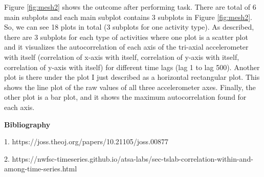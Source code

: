 \documentclass{article}
\begin{document}
Figure \ref{fig:mesh2} shows the outcome after performing task. There are total of 6 main subplots and each main subplot contains 3 subplots in Figure \ref{fig:mesh2}. So, we can see 18 plots in total (3 subplots for one activity type).
As described, there are 3 subplots for each type of activities where one plot is a scatter plot and it visualizes the autocorrelation of each axis of the tri-axial accelerometer with itself (correlation of x-axis with itself, correlation of y-axis with itself, correlation of y-axis with itself) for different time lags (lag 1 to lag 500). Another plot is there under the plot I just described as a horizontal rectangular plot. This shows the line plot of the raw values of all three accelerometer axes. Finally, the other plot is a bar plot, and it shows the maximum autocorrelation found for each axis.

\vspace{1cm}
\textbf{Bibliography}

1. https://joss.theoj.org/papers/10.21105/joss.00877

2. https://nwfsc-timeseries.github.io/atsa-labs/sec-tslab-correlation-within-and-among-time-series.html
\end{document}
